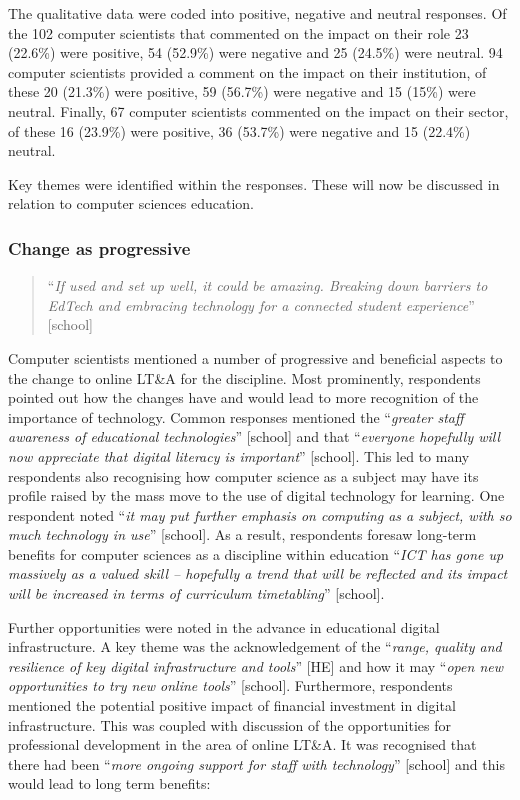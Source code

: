 \documentclass[sigconf]{acmart}
\begin{document}
The qualitative data were coded into positive, negative and neutral
responses. Of the 102 computer scientists that commented on the impact
on their role 23 (22.6\%) were positive, 54 (52.9\%) were negative and
25 (24.5\%) were neutral.  94 computer scientists provided a comment
on the impact on their institution, of these 20 (21.3\%) were
positive, 59 (56.7\%) were negative and 15 (15\%) were
neutral. Finally, 67 computer scientists commented on the impact on
their sector, of these 16 (23.9\%) were positive, 36 (53.7\%) were
negative and 15 (22.4\%) neutral.

Key themes were identified within the responses. These will now be
discussed in relation to computer sciences education.

\subsubsection*{Change as progressive}

\begin{quotation}
``{\emph{If used and set up well, it could be amazing.  Breaking down
barriers to EdTech and embracing technology for a connected student
experience}}'' [school]
\end{quotation}

Computer scientists mentioned a number of progressive and beneficial
aspects to the change to online LT\&A for the discipline. Most
prominently, respondents pointed out how the changes have and would
lead to more recognition of the importance of technology. Common
responses mentioned the ``{\emph{greater staff awareness of
educational technologies}}” [school] and that ``{\emph{everyone
hopefully will now appreciate that digital literacy is important}}''
[school]. This led to many respondents also recognising how computer
science as a subject may have its profile raised by the mass move to
the use of digital technology for learning. One respondent noted
``{\emph{it may put further emphasis on computing as a subject, with
so much technology in use}}'' [school]. As a result, respondents
foresaw long-term benefits for computer sciences as a discipline
within education ``{\emph{ICT has gone up massively as a valued skill
-- hopefully a trend that will be reflected and its impact will be
increased in terms of curriculum timetabling}}'' [school].

Further opportunities were noted in the advance in educational digital
infrastructure. A key theme was the acknowledgement of the
``{\emph{range, quality and resilience of key digital infrastructure
and tools}}'' [HE] and how it may ``{\emph{open new opportunities to
try new online tools}}'' [school]. Furthermore, respondents mentioned
the potential positive impact of financial investment in digital
infrastructure. This was coupled with discussion of the opportunities
for professional development in the area of online LT\&A. It was
recognised that there had been ``{\emph{more ongoing support for staff
with technology}}'' [school] and this would lead to long term
benefits:
\end{document}

